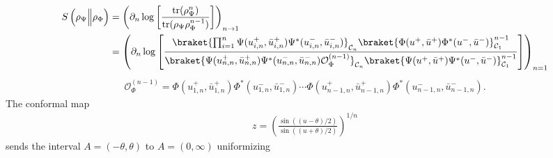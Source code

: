 \documentclass[11pt]{article}
\newcommand{\p}{\partial}
\newcommand{\mO}{\mathcal{O}}
\newcommand{\nn}{\nonumber}
\newcommand{\lb}{\left(}
\newcommand{\rb}{\right)}
\newcommand{\JM}[1]{\textcolor{orange}{#1}}
\begin{document}
  \begin{align}\label{relEntropyReplica}
    S\left(\rho_\Psi \Big\| \rho_\Phi\right)&=\lb \partial_{n}
    \log \left[ \frac{\text{tr}(\rho_{\Psi}^{n})}{\text{tr}(\rho_{\Psi}\rho_{\Phi}^{n-1})}
    \right]\rb_{n\to 1}\nn\\
    &=\lb
    \p_n\log\left[
    \frac{\braket{\prod_{i=1}^{n} \Psi(u^+_{i,n}, \bar u_{i,n}^+)\Psi^*(u^-_{i,n},\bar u_{i,n}^-)}_{\mathcal{C}_n}\braket{\Phi(u^+,\bar u^+)\Phi^*(u^-,\bar u^-)}_{\mathcal{C}_1}^{n-1}}{\braket{\Psi(u^+_{n,n}, \bar u_{n,n}^+)\Psi^*(u^-_{n,n},\bar u_{n,n}^-)\mO^{(n-1)}_{\Phi}}_{\mathcal{C}_n}\braket{\Psi(u^+,\bar u^+)\Psi^*(u^-,\bar u^-)}_{\mathcal{C}_1}^{n-1}}\right]
    \rb_{n=1}
  \end{align}
  \begin{eqnarray}\label{corrFncyl}
    \mO_{\Phi}^{(n-1)}=
    \Phi(u_{1,n}^+,\bar u_{1,n}^+)\Phi^*(u_{1,n}^-, \bar u_{1,n}^-)\cdots \Phi(u_{n-1,n}^+,\bar u_{n-1,n}^+)\Phi^*(u_{n-1,n}^-,\bar u_{n-1,n}^-).
  \end{eqnarray}
   The conformal map \cite{Lashkari_2016}
  \begin{eqnarray}
    z=\lb\frac{\sin((u-\theta)/2)}{\sin((u+\theta)/2)}\rb^{1/n}
  \end{eqnarray}
  sends the interval $A=(-\theta,\theta)$ to $A=(0,\infty)$ uniformizing
\end{document}
